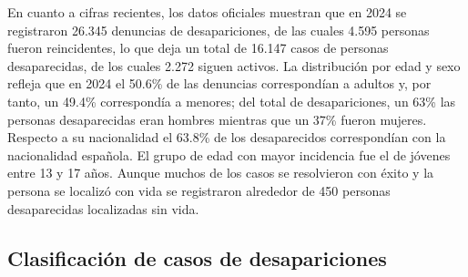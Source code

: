     En cuanto a cifras recientes, los datos oficiales muestran que en 2024 se registraron 26.345 denuncias de desapariciones, de las cuales 4.595 personas fueron reincidentes, lo que deja un total de 16.147 casos de personas desaparecidas, de los cuales 2.272 siguen activos. La distribución por edad y sexo refleja que en 2024 el 50.6\% de las denuncias correspondían a adultos y, por tanto, un 49.4\% correspondía a menores; del total de desapariciones, un 63\% las personas desaparecidas eran hombres mientras que un 37\% fueron mujeres. Respecto a su nacionalidad el 63.8\% de los desaparecidos correspondían con la nacionalidad española. El grupo de edad con mayor incidencia fue el de jóvenes entre 13 y 17 años. Aunque muchos de los casos se resolvieron con éxito y la persona se localizó con vida se registraron alrededor de 450 personas desaparecidas localizadas sin vida.\cite{DatosDesaparecidos2024, InformeCNDES2025}    

    
    \subsection{Clasificación de casos de desapariciones} 
    

